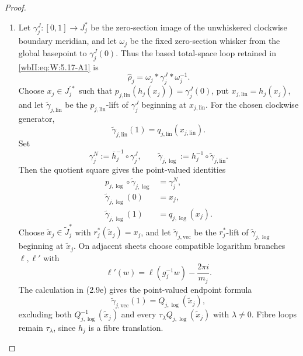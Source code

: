 \begin{proof}
\begin{enumerate}[label={$\langle1\rangle$\arabic*.},leftmargin=*]
\item Let \(\gamma_j^J:[0,1]\to J_j^*\) be the zero-section image of the
unwhiskered clockwise boundary meridian, and let \(\omega_j\) be the fixed
zero-section whisker from the global basepoint to \(\gamma_j^J(0)\).  Thus
the based total-space loop retained in \eqref{wbII:eq:W:5.17-A1} is
\[
 \widehat\rho_j=\omega_j*\gamma_j^J*\omega_j^{-1}.
\]
Choose \(x_j\in J_j^{\prime *}\) such that
\(p_{j,\mathrm{lin}}(h_j(x_j))=\gamma_j^J(0)\), put
\(x_{j,\mathrm{lin}}=h_j(x_j)\), and let
\(\widetilde\gamma_{j,\mathrm{lin}}\) be the
\(p_{j,\mathrm{lin}}\)-lift of \(\gamma_j^J\) beginning at
\(x_{j,\mathrm{lin}}\).  For the chosen clockwise generator,
\[
 \widetilde\gamma_{j,\mathrm{lin}}(1)
 =q_{j,\mathrm{lin}}(x_{j,\mathrm{lin}}).
\]
Set
\[
 \gamma_j^N:=\bar h_j^{-1}\circ\gamma_j^J,
 \qquad
 \widetilde\gamma_{j,\log}
 :=h_j^{-1}\circ\widetilde\gamma_{j,\mathrm{lin}}.
\]
Then the quotient square gives the point-valued identities
\[
\begin{aligned}
 p_{j,\log}\circ\widetilde\gamma_{j,\log}
  &=\gamma_j^N,\\
 \widetilde\gamma_{j,\log}(0)&=x_j,\\
 \widetilde\gamma_{j,\log}(1)&=q_{j,\log}(x_j).
\end{aligned}
\]
Choose \(\widetilde x_j\in\widetilde J_j^*\) with
\(r_j^*(\widetilde x_j)=x_j\), and let
\(\widetilde\gamma_{j,\mathrm{vec}}\) be the \(r_j^*\)-lift of
\(\widetilde\gamma_{j,\log}\) beginning at \(\widetilde x_j\).  On
adjacent sheets choose compatible logarithm branches \(\ell,\ell'\) with
\[
 \ell'(w)=\ell(g_j^{-1}w)-\frac{2\pi i}{m_j}.
\]
The calculation in (2.9e) gives the point-valued endpoint formula
\[
 \widetilde\gamma_{j,\mathrm{vec}}(1)
 =Q_{j,\log}(\widetilde x_j),
\]
excluding both \(Q_{j,\log}^{-1}(\widetilde x_j)\) and every
\(\tau_\lambda Q_{j,\log}(\widetilde x_j)\) with \(\lambda\ne0\).
Fibre loops remain \(\tau_\lambda\), since \(h_j\) is a fibre translation.


\end{enumerate}
\end{proof}
